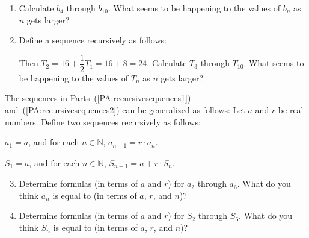 \begin{previewactivity}
\begin{enumerate}
\item Calculate  $b_4 $ through  $b_{10} $. What seems to be happening to the values of  $b_n $
as  $n$  gets larger? \label{PA:recursivesequences1}

\item Define a sequence recursively as follows: \label{PA:recursivesequences2}


Then $T_2 = 16 + \dfrac{1}{2} T_1 = 16 + 8 = 24$.  Calculate  $T_3 $ through  $T_{10} $.  What seems to be happening to the values of  $T_n $ as  $n$  gets larger?

\end{enumerate}

\noindent
The sequences in Parts~(\ref{PA:recursivesequences1}) and~(\ref{PA:recursivesequences2}) can be generalized as follows:  Let  $a$  and  $r$  be real numbers.  Define two sequences recursively as follows:

\begin{list}{}
\item $a_1  = a$, and for each  $n \in \mathbb{N}$,  $a_{n + 1}  = r \cdot a_n $.

\item $S_1  = a$, and for each  $n \in \mathbb{N}$,  $S_{n + 1}  = a + r \cdot S_n $.
\end{list}

\begin{enumerate}
\setcounter{enumi}{2}
\item Determine  formulas (in terms of  $a$  and  $r$) for  $a_2 $ through  $a_6 $.  What do you think  $a_n $ is equal to (in terms of  $a$, $r$, and  $n$)?

\item Determine  formulas (in terms of  $a$  and  $r$) for  $S_2 $ through  $S_6 $.  What do you think  $S_n $ is equal to (in terms of  $a$, $r$, and  $n$)?

\end{enumerate}



\end{previewactivity}
